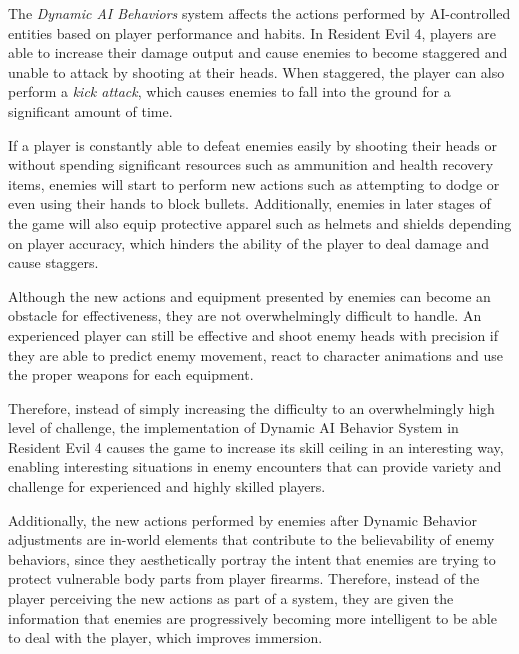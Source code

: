 The \emph{Dynamic AI Behaviors} system affects the actions performed by AI-controlled entities based on player performance and habits. In Resident Evil 4, players are able to increase their damage output and cause enemies to become staggered and unable to attack by shooting at their heads. When staggered, the player can also perform a \emph{kick attack}, which causes enemies to fall into the ground for a significant amount of time. 

If a player is constantly able to defeat enemies easily by shooting their heads or without spending significant resources such as ammunition and health recovery items, enemies will start to perform new actions such as attempting to dodge or even using their hands to block bullets. Additionally, enemies in later stages of the game will also equip protective apparel such as helmets and shields depending on player accuracy, which hinders the ability of the player to deal damage and cause staggers.

Although the new actions and equipment presented by enemies can become an obstacle for effectiveness, they are not overwhelmingly difficult to handle. An experienced player can still be effective and shoot enemy heads with precision if they are able to predict enemy movement, react to character animations and use the proper weapons for each equipment.





Therefore, instead of simply increasing the difficulty to an overwhelmingly high level of challenge, the implementation of Dynamic AI Behavior System in Resident Evil 4 causes the game to increase its skill ceiling in an interesting way, enabling interesting situations in enemy encounters that can provide variety and challenge for experienced and highly skilled players.

Additionally, the new actions performed by enemies after Dynamic Behavior adjustments are in-world elements that contribute to the believability of enemy behaviors, since they aesthetically portray the intent that enemies are trying to protect vulnerable body parts from player firearms. Therefore, instead of the player perceiving the new actions as part of a system, they are given the information that enemies are progressively becoming more intelligent to be able to deal with the player, which improves immersion.

